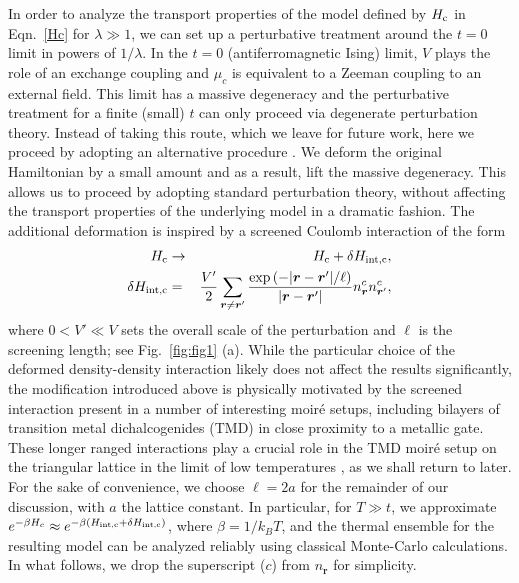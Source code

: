 \documentclass[aps,prx,onecolumn,amsmath,nofootinbib,amssymb,11pt]{revtex4-1}
\renewcommand{\vec}[1]{\boldsymbol{#1}}
\def \r {{\vec r}}
\def \beq {\begin{eqnarray}}
\def \eeq {\end{eqnarray}}
\def \tn {\textnormal}
\def \hc {H_{\tn{c}}}
\def \Hc {H_{\textnormal{int,c}}}
\begin{document}
In order to analyze the transport properties of the model defined by $\hc$ in Eqn.~\ref{Hc} for $\lambda\gg1$, we can set up a perturbative treatment around the $t=0$ limit in powers of $1/\lambda$. In the $t=0$ (antiferromagnetic Ising) limit, $V$ plays the role of an exchange coupling and $\mu_c$ is equivalent to a Zeeman coupling to an external field. This limit has a massive degeneracy and the perturbative treatment for a finite (small) $t$ can only proceed via degenerate perturbation theory. Instead of taking this route, which we leave for future work, here we proceed by adopting an alternative procedure \cite{Hartnoll18}. We deform the original Hamiltonian by a small amount and as a result, lift the massive degeneracy. This allows us to proceed by adopting standard perturbation theory, without affecting the transport properties of the underlying model in a dramatic fashion. The additional deformation is inspired by a screened Coulomb interaction of the form 
\beq
\hc &\rightarrow& \hc + \delta\Hc,\\
\delta\Hc &=& \frac{V'}{2} \sum_{\r\neq\r'}\frac{\exp{\left( -|\r-\r'|/\ell\right) }}{|\r-\r'|}n^c_\r n^c_{\r'},
    \label{eqn:LongV}
\eeq
where $0<V'\ll V$ sets the overall scale of the perturbation and $\ell$ is the screening length; see Fig.~\ref{fig:fig1} (a). While the particular choice of the deformed density-density interaction likely does not affect the results significantly, the modification introduced above is physically motivated by the screened interaction present in a number of interesting moir\'e setups, including bilayers of transition metal dichalcogenides (TMD) in close proximity to a metallic gate. These longer ranged interactions play a crucial role in the TMD moir\'e setup on the triangular lattice in the limit of low temperatures \cite{xu2020abundance}, as we shall return to later. For the sake of convenience, we choose $\ell=2a$ for the remainder of our discussion, with $a$ the lattice constant. In particular, for $T\gg t$, we approximate $e^{-\beta H_c}\approx e^{-\beta(\Hc + \delta\Hc)}$, where $\beta=1/k_BT$, and the thermal ensemble for the resulting model can be analyzed reliably using classical Monte-Carlo calculations. In what follows, we drop the superscript ($c$) from $n_\r$ for simplicity.
\end{document}

